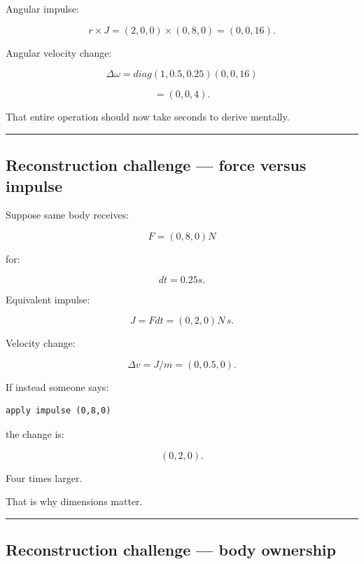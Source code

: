 Angular impulse:

\[
r\times J
=
(2,0,0)
\times
(0,8,0)
=
(0,0,16).
\]

Angular velocity change:

\[
\Delta\omega
=
diag(1,0.5,0.25)
(0,0,16)
\]

\[
=
(0,0,4).
\]

That entire operation should now take seconds to derive mentally.

\begin{center}\rule{0.5\linewidth}{0.5pt}\end{center}

\subsection{Reconstruction challenge --- force versus impulse}\label{06-engine-ii-ch038-reconstruction-challenge-force-versus-impulse}

\hypertarget{06-engine-ii-ch038-reconstruction-challenge-force-versus-impulse}{}

Suppose same body receives:

\[
F=(0,8,0)N
\]

for:

\[
dt=0.25s.
\]

Equivalent impulse:

\[
J=Fdt
=
(0,2,0)N\,s.
\]

Velocity change:

\[
\Delta v
=
J/m
=
(0,0.5,0).
\]

If instead someone says:

\begin{verbatim}
apply impulse (0,8,0)
\end{verbatim}

the change is:

\[
(0,2,0).
\]

Four times larger.

That is why dimensions matter.

\begin{center}\rule{0.5\linewidth}{0.5pt}\end{center}

\subsection{Reconstruction challenge --- body ownership}\label{06-engine-ii-ch038-reconstruction-challenge-body-ownership}

\hypertarget{06-engine-ii-ch038-reconstruction-challenge-body-ownership}{}

